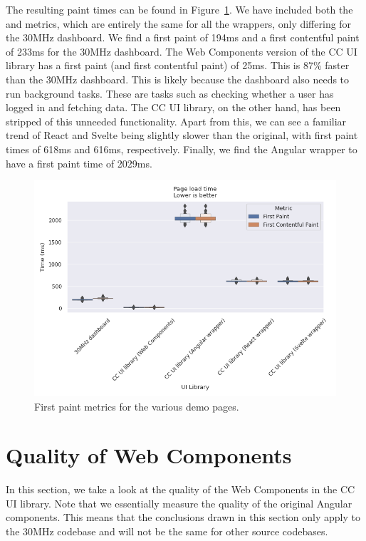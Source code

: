 The resulting paint times can be found in Figure~\ref{fig:results:first-paint}. We have included both the  and  metrics, which are entirely the same for all the wrappers, only differing for the 30MHz dashboard. We find a first paint of 194ms and a first contentful paint of 233ms for the 30MHz dashboard. The Web Components version of the CC UI library has a first paint (and first contentful paint) of 25ms. This is 87\% faster than the 30MHz dashboard. This is likely because the dashboard also needs to run background tasks. These are tasks such as checking whether a user has logged in and fetching data. The CC UI library, on the other hand, has been stripped of this unneeded functionality. Apart from this, we can see a familiar trend of React and Svelte being slightly slower than the original, with first paint times of 618ms and 616ms, respectively. Finally, we find the Angular wrapper to have a first paint time of 2029ms.

\begin{figure}[h]
  \includegraphics[width=\columnwidth]{plots/first-contentful-paint.png}
  \caption{First paint metrics for the various demo pages.}
  \label{fig:results:first-paint}
  \centering
\end{figure}

\section{Quality of Web Components}
In this section, we take a look at the quality of the Web Components in the CC UI library. Note that we essentially measure the quality of the original Angular components. This means that the conclusions drawn in this section only apply to the 30MHz codebase and will not be the same for other source codebases.

